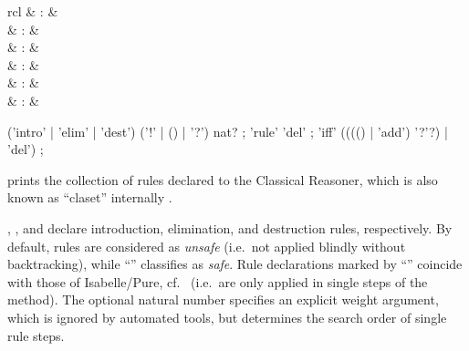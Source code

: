 \begin{isabellebody}
\begin{isamarkuptext}
\begin{descr}
  \end{descr}%
\end{isamarkuptext}%
\isamarkuptrue%
%
\isamarkuptrue%
%
\begin{isamarkuptext}%
\begin{matharray}{rcl}
    \hypertarget{command.print_claset}{\hyperlink{command.print_claset}{\mbox{}}}\isa{{\isachardoublequote}\isactrlsup {\isacharasterisk}{\isachardoublequote}} & : &  \\
    \hypertarget{attribute.intro}{\hyperlink{attribute.intro}{\mbox{}}} & : & \isaratt \\
    \hypertarget{attribute.elim}{\hyperlink{attribute.elim}{\mbox{}}} & : & \isaratt \\
    \hypertarget{attribute.dest}{\hyperlink{attribute.dest}{\mbox{}}} & : & \isaratt \\
    \hypertarget{attribute.rule}{\hyperlink{attribute.rule}{\mbox{}}} & : & \isaratt \\
    \hypertarget{attribute.iff}{\hyperlink{attribute.iff}{\mbox{}}} & : & \isaratt \\
  \end{matharray}

  \begin{rail}
    ('intro' | 'elim' | 'dest') ('!' | () | '?') nat?
    ;
    'rule' 'del'
    ;
    'iff' (((() | 'add') '?'?) | 'del')
    ;
  \end{rail}

  \begin{descr}

  \item [\hyperlink{command.print_claset}{\mbox{\isa{\isacommand{print{\isacharunderscore}claset}}}}] prints the collection of rules
  declared to the Classical Reasoner, which is also known as
  ``claset'' internally \cite{isabelle-ref}.
  
  \item [\hyperlink{attribute.intro}{\mbox{\isa{intro}}}, \hyperlink{attribute.elim}{\mbox{\isa{elim}}}, and \hyperlink{attribute.dest}{\mbox{\isa{dest}}}]
  declare introduction, elimination, and destruction rules,
  respectively.  By default, rules are considered as \emph{unsafe}
  (i.e.\ not applied blindly without backtracking), while ``\isa{{\isachardoublequote}{\isacharbang}{\isachardoublequote}}'' classifies as \emph{safe}.  Rule declarations marked by
  ``\isa{{\isachardoublequote}{\isacharquery}{\isachardoublequote}}'' coincide with those of Isabelle/Pure, cf.\
   (i.e.\ are only applied in single steps
  of the \hyperlink{method.rule}{\mbox{\isa{rule}}} method).  The optional natural number
  specifies an explicit weight argument, which is ignored by automated
  tools, but determines the search order of single rule steps.


\end{descr}
\end{isamarkuptext}
\end{isabellebody}
